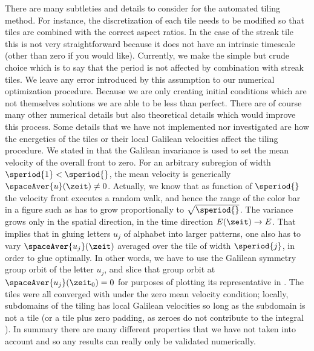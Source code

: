 There are many subtleties and details to consider for
the automated tiling method. For instance, the discretization
of each tile needs to be modified so that tiles are combined
with the correct aspect ratios.
In the case of the streak tile this is not very straightforward because
it does not have an intrinsic timescale (other than zero if you would like).
Currently, we make the simple but crude choice which is to say that
the period is not affected by combination with streak tiles. We leave any
error introduced by this assumption to our numerical
optimization procedure. Because we are only creating initial conditions
which are not themselves solutions we are able to be less than perfect.
There are of course many other numerical details but also theoretical details
which would improve this process. Some details that we have
not implemented nor investigated are how
the energetics of the tiles or their local Galilean velocities affect
the tiling procedure. We stated in  that the
Galilean invariance  is used to set the mean velocity of
the overall front to zero.
For an arbitrary subregion of width $\speriod{1}< \speriod{}$, the
mean velocity is generically $\spaceAver{u}(\zeit)\neq0$. Actually, we
know that as function of $\speriod{}$ the velocity front executes a
random walk,
and hence the range of the color bar in a figure such
as  has to grow proportionally to
$\sqrt{\speriod{}}$. The variance grows only in the spatial direction, in
the time direction $E(\zeit)\to{E}$.
That implies that in gluing letters $u_j$ of alphabet
 into larger patterns, one also has to vary
$\spaceAver{u_j}(\zeit)$ averaged over the tile of width $\speriod{j}$,
in order to glue optimally. In other words, we have to use the Galilean
symmetry group orbit of the letter $u_j$, and slice that group orbit at
$\spaceAver{u_j}(\zeit_0)=0$ for purposes of plotting its representative
in . The tiles  were all converged
with under the zero mean velocity condition; locally, subdomains of
the tiling has local Galilean velocities so long as the subdomain is not
a tile (or a tile plus zero padding, as zeroes do not contribute to the integral
).
In summary there are many different properties that we have not taken
into account and so any results can really only be validated numerically.

